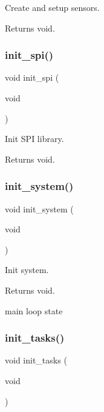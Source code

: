Create and setup sensors. 

\begin{DoxyReturn}{Returns}
void. 
\end{DoxyReturn}
\mbox{\label{i2c-rain_8ino_a8eb9780a3438ec02c70314744f91f3c7}} 
\subsubsection{\texorpdfstring{init\+\_\+spi()}{init\_spi()}}
{\footnotesize\ttfamily void init\+\_\+spi (\begin{DoxyParamCaption}\item[{void}]{ }\end{DoxyParamCaption})}



Init S\+PI library. 

\begin{DoxyReturn}{Returns}
void. 
\end{DoxyReturn}
\mbox{\label{i2c-rain_8ino_afceb890a6ab9be73cc5481369538c705}} 
\subsubsection{\texorpdfstring{init\+\_\+system()}{init\_system()}}
{\footnotesize\ttfamily void init\+\_\+system (\begin{DoxyParamCaption}\item[{void}]{ }\end{DoxyParamCaption})}



Init system. 

\begin{DoxyReturn}{Returns}
void. 
\end{DoxyReturn}
main loop state \mbox{\label{i2c-rain_8ino_ab4bf0a3d77da083f131d3fa35a37d2b1}} 
\subsubsection{\texorpdfstring{init\+\_\+tasks()}{init\_tasks()}}
{\footnotesize\ttfamily void init\+\_\+tasks (\begin{DoxyParamCaption}\item[{void}]{ }\end{DoxyParamCaption})}



